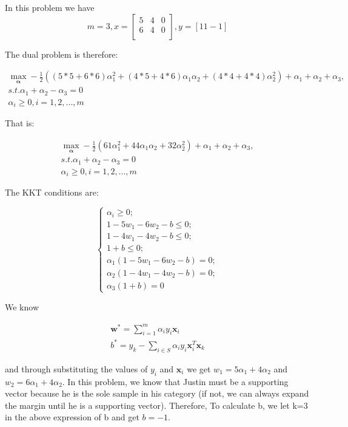 \documentclass{article}
\begin{document}
In this problem we have
\begin{equation}
m=3, x = 
\begin{bmatrix}
5 & 4 & 0 \\
6 & 4 & 0 \\
\end{bmatrix}
, y=[1 1 -1]
\end{equation}

The dual problem is therefore:

\begin{gather*} \label{eq1}
\max_{\boldsymbol{\alpha}} -\frac{1}{2}((5*5+6*6)\alpha_1^2 + (4*5+4*6)\alpha_1\alpha_2 + (4*4+4*4)\alpha_2^2) + \alpha_1 + \alpha_2 + \alpha_3,  \\
s.t. \alpha_1 + \alpha_2 - \alpha_3 = 0 \\
\alpha_i \geq 0, i=1,2,...,m
\end{gather*}

That is:

\begin{gather*}
\max_{\boldsymbol{\alpha}} -\frac{1}{2}(61\alpha_1^2 + 44\alpha_1\alpha_2 + 32\alpha_2^2) + \alpha_1 + \alpha_2 + \alpha_3,  \\
s.t. \alpha_1 + \alpha_2 - \alpha_3= 0 \\
\alpha_i \geq 0, i=1,2,...,m
\end{gather*}

The KKT conditions are:

\begin{equation}
\begin{cases} \alpha_i \geq 0; \\ 
1-5w_1-6w_2-b \leq 0; \\
1-4w_1-4w_2-b \leq 0; \\
1+b \leq 0; \\
\alpha_1(1-5w_1-6w_2-b) = 0; \\
\alpha_2(1-4w_1-4w_2-b) = 0; \\
\alpha_3(1+b) = 0
\end{cases}
\end{equation}

We know 

\begin{gather*}
\boldsymbol{w}^* = \sum_{i=1}^{m}{\alpha_i y_i \boldsymbol{x}_i} \\
b^* = y_k - \sum_{i \in S}{\alpha_i y_i \boldsymbol{x}_i^T \boldsymbol{x}_k}
\end{gather*}

and through substituting the values of $y_i$ and $\boldsymbol{x}_i$ we get $w_1 = 5\alpha_1 + 4\alpha_2$ and $w_2 = 6\alpha_1 + 4\alpha_2$. In this problem, we know that Justin must be a supporting vector because he is the sole sample in his category (if not, we can always expand the margin until he is a supporting vector). Therefore, To calculate b, we let k=3 in the above expression of b and get $b=-1$.
\end{document}

